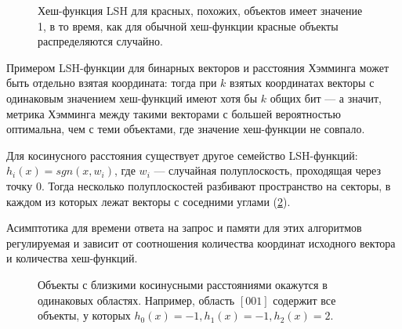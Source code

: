 \documentclass[a4paper,12pt]{extarticle}
\begin{document}
\begin{center}
\begin{figure}[H]
\caption{Хеш-функция LSH для красных, похожих, объектов имеет значение 1, в то время, как для обычной хеш-функции красные объекты распределяются случайно.}
\label{ris:lsh_hashtable}
\end{figure}
\end{center}


Примером LSH-функции для бинарных векторов и расстояния Хэмминга может быть отдельно взятая координата: тогда при $k$ взятых координатах векторы с одинаковым значением хеш-функций имеют хотя бы $k$ общих бит --- а значит, метрика Хэмминга между такими векторами с большей вероятностью оптимальна, чем с теми объектами, где значение хеш-функции не совпало.

Для косинусного расстояния существует другое семейство LSH-функций: $h_i(x) = sgn (x, w_i)$, где $w_i$ --- случайная полуплоскость, проходящая через точку $0$. Тогда несколько полуплоскостей разбивают пространство на секторы, в каждом из которых лежат векторы с соседними углами (\cref{ris:lsh_cosine}).

Асимптотика для времени ответа на запрос и памяти для этих алгоритмов регулируемая и зависит от соотношения количества координат исходного вектора и количества хеш-функций.

\begin{center}
\begin{figure}[H]
\caption{Объекты с близкими косинусными расстояниями окажутся в одинаковых областях. Например, область $[001]$ содержит все объекты, у которых $h_0(x) = -1, h_1(x) = -1, h_2(x) = 2$.}
\label{ris:lsh_cosine}
\end{figure}
\end{center}
\end{document}
